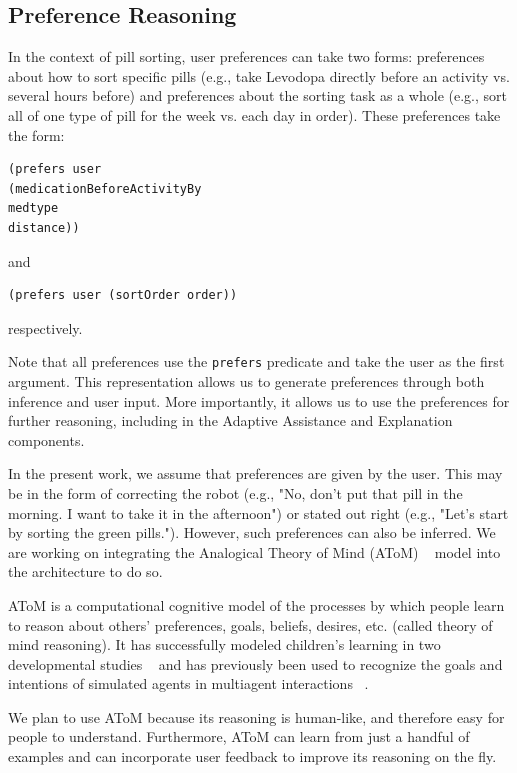 \documentclass[letterpaper]{article}
\begin{document}
\subsection{Preference Reasoning}
In the context of pill sorting, user preferences can take two forms: preferences about how to sort specific pills (e.g., take Levodopa directly before an activity vs. several hours before) and preferences about the sorting task as a whole (e.g., sort all of one type of pill for the week vs. each day in order). These preferences take the form:
\small{
\begin{verbatim}
(prefers user
(medicationBeforeActivityBy
medtype
distance))
\end{verbatim}}
\noindent
and

\small{
\begin{verbatim}(prefers user (sortOrder order))
\end{verbatim}}
\noindent
respectively.

Note that all preferences use the \texttt{prefers} predicate and take the user as the first argument. This representation allows us to generate preferences through both inference and user input. More importantly, it allows us to use the preferences for further reasoning, including in the Adaptive Assistance and Explanation components.

In the present work, we assume that preferences are given by the user. This may be in the form of correcting the robot (e.g., "No, don't put that pill in the morning. I want to take it in the afternoon") or stated out right (e.g., "Let's start by sorting the green pills."). However, such preferences can also be inferred. We are working on integrating the Analogical Theory of Mind (AToM) ~\cite{rabkina2017towards} model into the architecture to do so.

AToM is a computational cognitive model of the processes by which people learn to reason about others' preferences, goals, beliefs, desires, etc. (called theory of mind reasoning). It has successfully modeled children's learning in two developmental studies ~\cite{rabkina2017towards,rabkina2018bootstrapping} and has previously been used to recognize the goals and intentions of simulated agents in multiagent interactions ~\cite{rabkina2019analogical,rabkina2020acs}.

We plan to use AToM because its reasoning is human-like, and therefore easy for people to understand. Furthermore, AToM can learn from just a handful of examples and can incorporate user feedback to improve its reasoning on the fly.
\end{document}
